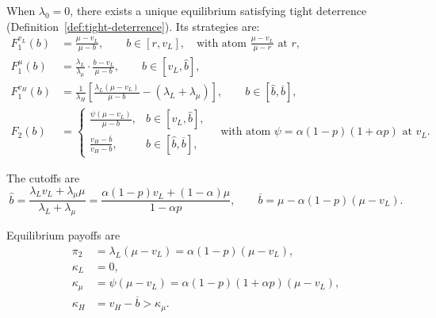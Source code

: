 \begin{prop} \label{prop:nonbinding}
When $\lambda_0 = 0$, there exists a unique equilibrium satisfying tight deterrence (Definition~\ref{def:tight-deterrence}). Its strategies are:
\begin{align*}
F_1^{v_L}(b) &= \frac{\mu - v_L}{\mu - b}, \qquad b \in [r, v_L], \quad \text{with atom } \frac{\mu - v_L}{\mu - r} \text{ at } r, \\[4pt]
F_1^{\mu}(b) &= \frac{\lambda_L}{\lambda_{\mu}} \cdot \frac{b - v_L}{\mu - b}, \qquad b \in [v_L, \hat{b}], \\[4pt]
F_1^{v_H}(b) &= \frac{1}{\lambda_H}\left[\frac{\lambda_L(\mu - v_L)}{\mu - b} - (\lambda_L + \lambda_{\mu})\right], \qquad b \in [\hat{b}, \overline{b}], \\[4pt]
F_2(b) &= \begin{cases}
\frac{\psi(\mu - v_L)}{\mu - b}, & b \in [v_L, \hat{b}], \\[4pt]
\frac{v_H - \overline{b}}{v_H - b}, & b \in [\hat{b}, \overline{b}],
\end{cases} \quad \text{with atom } \psi = \alpha(1-p)(1+\alpha p) \text{ at } v_L.
\end{align*}

\noindent The cutoffs are
\[
\hat{b} = \frac{\lambda_L v_L + \lambda_{\mu} \mu}{\lambda_L + \lambda_{\mu}} = \frac{\alpha(1-p)v_L + (1-\alpha)\mu}{1 - \alpha p}, \qquad \overline{b} = \mu - \alpha(1-p)(\mu - v_L).
\]

\noindent Equilibrium payoffs are
\begin{align*}
\pi_2 &= \lambda_L (\mu - v_L) = \alpha(1-p)(\mu - v_L), \\[3pt]
\kappa_L &= 0, \\[3pt]
\kappa_{\mu} &= \psi (\mu - v_L) = \alpha(1-p)(1+\alpha p)(\mu - v_L), \\[3pt]
\kappa_H &= v_H - \overline{b} > \kappa_{\mu}.
\end{align*}
\end{prop}

